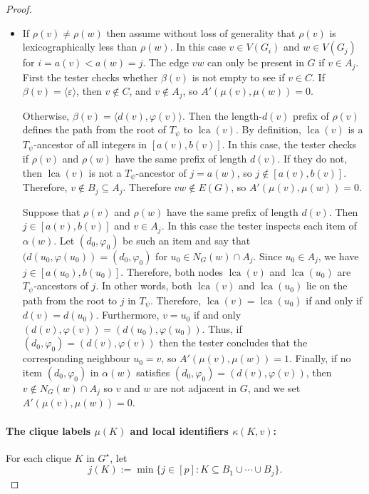 \documentclass{patmorin}
\renewcommand{\ge}{\geqslant}
\newcommand{\piotr}[1]{\noindent\textcolor{red}{PiMi: #1}}
\DeclareMathOperator{\lca}{lca}
\newcommand{\calK}{\mathcal{K}}
\begin{document}
\begin{proof}
\begin{itemize}
       \item If $\rho(v)\neq\rho(w)$ then assume without loss of generality that $\rho(v)$ is lexicographically less than $\rho(w)$.
       In this case $v\in V(G_i)$ and $w\in V(G_j)$ for $i=a(v)<a(w)=j$.
       The edge $vw$ can only be present in $G$ if $v\in A_j$.
       First the tester checks whether $\beta(v)$ is not empty to see if $v\in C$.
       If $\beta(v)=\langle\varepsilon\rangle$, then
       $v\not\in C$, and  $v\not\in A_j$, so $A'(\mu(v),\mu(w))=0$.

       Otherwise, $\beta(v)=\langle d(v),\varphi(v)\rangle$.  Then the length-$d(v)$ prefix of $\rho(v)$ defines the path from the root of $T_\psi$ to $\lca(v)$.  By definition, $\lca(v)$ is a $T_\psi$-ancestor of all integers in $[a(v),b(v)]$. In this case, the tester checks if $\rho(v)$ and $\rho(w)$ have the same prefix of length $d(v)$.  If they do not, then $\lca(v)$ is not a $T_\psi$-ancestor of $j=a(w)$, so $j\not\in[a(v),b(v)]$.  Therefore, $v\not\in B_{j}\subseteq A_j$.
       Therefore $vw\not\in E(G)$, so $A'(\mu(v),\mu(w))=0$.

       Suppose that $\rho(v)$ and $\rho(w)$ have the same prefix of length $d(v)$.  Then $j\in [a(v),b(v)]$ and $v\in A_j$.
       In this case the tester inspects each item of $\alpha(w)$. Let $(d_0,\varphi_0)$ be such an item and say that $(d(u_0,\varphi(u_0))=(d_0,\varphi_0)$ for $u_0 \in N_G(w)\cap A_j$.
       Since $u_0 \in A_j$, we have $j\in[a(u_0),b(u_0)]$.
       Therefore, both nodes $\lca(v)$ and $\lca(u_0)$ are $T_\psi$-ancestors of $j$. In other words, both $\lca(v)$ and $\lca(u_0)$ lie on the path from the root to $j$ in $T_{\psi}$.
       Therefore, $\lca(v)=\lca(u_0)$ if and only if $d(v)=d(u_0)$. Furthermore, $v=u_0$ if and only $(d(v),\varphi(v))=(d(u_0),\varphi(u_0))$. Thus, if $(d_0,\varphi_0)=(d(v),\varphi(v))$ then the tester concludes that the corresponding neighbour $u_0=v$, so $A'(\mu(v),\mu(w))=1$.
       Finally, if no item $(d_0,\varphi_0)$ in $\alpha(w)$ satisfies $(d_0,\varphi_0)=(d(v),\varphi(v))$, then $v\not\in N_G(w)\cap A_j$ so $v$ and $w$ are not adjacent in $G$, and we set $A'(\mu(v),\mu(w))=0$.
     \end{itemize}



    \paragraph{\boldmath The clique labels $\mu(K)$ and local identifiers $\kappa(K,v)$:}
    For each clique $K$ in $G^\star$,
    let
    \[
      j(K):=\min\{j\in[p]:K\subseteq B_1\cup\cdots\cup B_j\}.
    \]


\end{proof}
\end{document}
